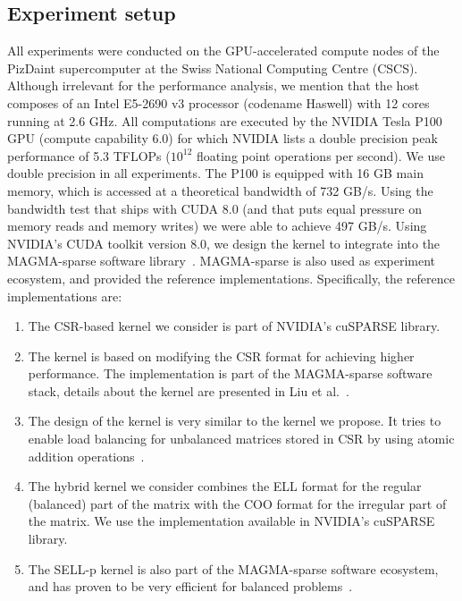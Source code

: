 \subsection{Experiment setup}
All experiments were conducted on the GPU-accelerated compute nodes of the 
PizDaint supercomputer at the Swiss National Computing Centre (CSCS). 
Although irrelevant for the performance analysis, we mention that the host composes of
an Intel E5-2690 v3 processor (codename Haswell) with 12 cores running at 2.6 GHz.
All computations are executed by the NVIDIA Tesla P100 GPU (compute capability 6.0)
for which NVIDIA lists a double precision peak performance of 5.3 TFLOPs ($10^{12}$ floating point operations per second). 
We use double precision in all experiments.
The P100 is equipped with 16 GB main memory, which
is accessed at a theoretical bandwidth of 732 GB/s.
Using the bandwidth test that ships with CUDA 8.0 (and that puts equal pressure 
on memory reads and memory writes) we were able to achieve 497 GB/s.
Using NVIDIA's CUDA toolkit version 8.0, we design the \coo kernel to
integrate into the MAGMA-sparse software library~\cite{parco2017}.
MAGMA-sparse is also used as experiment ecosystem, and provided
the  \spmv reference implementations. Specifically, the reference implementations are:
\begin{enumerate}
\item[\csr]
The CSR-based \spmv kernel we consider is part of NVIDIA's cuSPARSE library.
\item[\csrfive]
The \csrfive \spmv kernel is based on modifying the CSR format for achieving higher performance. The implementation is part of the MAGMA-sparse software stack, 
details about the kernel are presented in Liu et 
al.~\cite{Liu:2015:CES:2751205.2751209}.
\item[\csri]
The design of the \csri \spmv kernel is very similar to the \coo kernel we propose. 
It tries to enable load balancing for unbalanced matrices stored in CSR by
using atomic addition operations~\cite{csri}.  
\item[\hyb]
The hybrid \spmv kernel we consider combines the ELL format for the regular (balanced) part
of the matrix with the COO format for the irregular part of the matrix. We use the implementation available in NVIDIA's cuSPARSE library.
\item[\sellp]
The SELL-p kernel is also part of the MAGMA-sparse software ecosystem,
and has proven to be very efficient for balanced problems~\cite{sellc}.
\end{enumerate}


